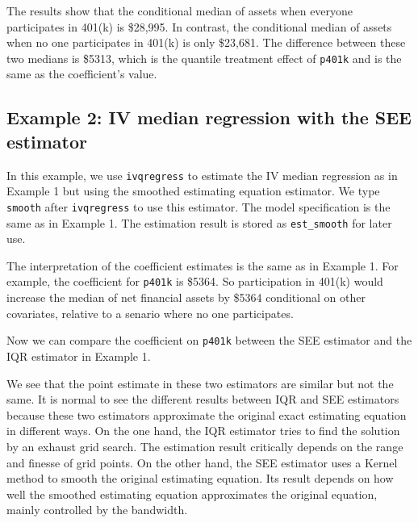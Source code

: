 \begin{stlog}

\end{stlog}

The results show that the conditional median of assets when everyone
participates in 401(k) is \$28,995. In contrast, the conditional median of
assets when no one participates in 401(k) is only \$23,681. The difference
between these two medians is \$5313, which is the quantile treatment effect of
{\tt p401k} and is the same as the coefficient's value.

\subsection{Example 2: IV median regression with the SEE estimator}
In this example, we use {\tt ivqregress} to estimate the IV median regression as
in Example 1 but using the smoothed estimating equation estimator. We type {\tt
smooth} after {\tt ivqregress} to use this estimator. The model specification is
the same as in Example 1. The estimation result is stored as {\tt est\_smooth}
for later use. 

\begin{stlog}

\end{stlog}

The interpretation of the coefficient estimates is the same as in Example 1.
For example, the coefficient for {\tt p401k} is \$5364. So participation in
401(k) would increase the median of net financial assets by \$5364 conditional
on other covariates, relative to a senario where no one participates.

Now we can compare the coefficient on {\tt p401k} between the SEE estimator and
the IQR estimator in Example 1.

\begin{stlog}

\end{stlog}

We see that the point estimate in these two estimators are similar but not the
same. It is normal to see the different results between IQR and SEE estimators
because these two estimators approximate the original exact estimating equation
in different ways. On the one hand, the IQR estimator tries to find the solution
by an exhaust grid search. The estimation result critically depends on the range
and finesse of grid points. On the other hand, the SEE estimator uses a Kernel
method to smooth the original estimating equation. Its result depends on how
well the smoothed estimating equation approximates the original equation, mainly
controlled by the bandwidth.  

